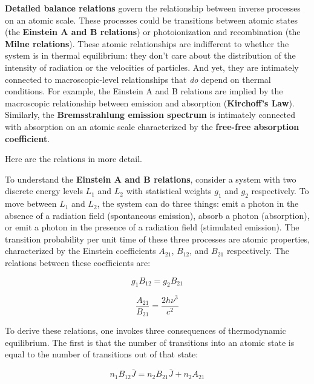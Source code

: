 \documentclass[12pt, letterpaper, preprint]{aastex}
\begin{document}
\begin{enumerate}
\textbf{Detailed balance relations} govern the relationship between inverse processes on an atomic scale.
These processes could be transitions between atomic states
(the \textbf{Einstein A and B relations})
or photoionization and recombination (the \textbf{Milne relations}).
These atomic relationships are indifferent to whether the system is in thermal equilibrium: they don't care about the distribution of the intensity of radiation or the velocities of particles.
And yet, they are intimately connected to macroscopic-level relationships that \emph{do} depend on thermal conditions.
For example, the Einstein A and B relations
are implied by the macroscopic relationship between
emission and absorption (\textbf{Kirchoff's Law}).
Similarly, the \textbf{Bremsstrahlung emission spectrum} 
is intimately connected with absorption on an atomic scale characterized by the \textbf{free-free absorption coefficient}.

Here are the relations in more detail.

To understand the \textbf{Einstein A and B relations},
consider a system with two discrete energy levels 
$L_1$ and $L_2$ with statistical weights $g_1$ and $g_2$ respectively. To move between $L_1$ and $L_2$, the system
can do three things: emit a photon in the absence of a radiation field (spontaneous emission), absorb a photon (absorption),
or emit a photon in the presence of a radiation field (stimulated emission). The transition probability per unit time of these three processes are atomic properties, characterized
by the Einstein coefficients $A_{21}$, $B_{12}$, and $B_{21}$ respectively. The relations between these coefficients are: 

\begin{equation}
  g_1 B_{12} = g_2 B_{21}
  \label{einstein-B}
\end{equation}

\begin{equation}
  \frac{A_{21}}{B_{21}} = \frac{2 h \nu^3}{c^2}
  \label{einstein-A}
\end{equation}

To derive these relations, one invokes three consequences of thermodynamic equilibrium. 
The first is that the number of transitions into an atomic state is equal to the number of transitions out of that state:

\begin{equation}
  n_1 B_{12} \bar{J} = n_2 B_{21} \bar{J} + n_2 A_{21}
  \label{detailed-balance}
\end{equation}


\end{enumerate}
\end{document}
